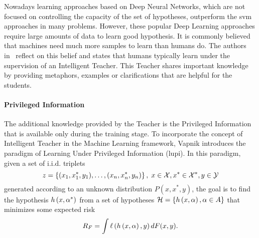 Nowadays learning approaches based on Deep Neural Networks, which are not focused on controlling the capacity of the set of hypotheses, outperform the \acrshort{svm} approaches in many problems. However, these popular Deep Learning approaches require large amounts of data to learn good hypothesis.
It is commonly believed that machines need much more samples to learn than humans do. The authors in~\citet{VapnikV09, VapnikI15a} reflect on this belief and states that humans typically learn under the supervision of an Intelligent Teacher.
This Teacher shares important knowledge by providing metaphors, examples or clarifications that are helpful for the students.



\paragraph*{Privileged Information\\}
The additional knowledge provided by the Teacher is the Privileged Information that is available only during the training stage.
To incorporate the concept of Intelligent Teacher in the Machine Learning framework, Vapnik introduces the paradigm of Learning Under Privileged Information (\acrshort{lupi}).
In this paradigm, given a set of i.i.d. triplets
$$ z = \left\{(x_1, x^*_1, y_1), \ldots, (x_n,x^*_n, y_n)\right\}, \; x \in \mathcal{X}, x^* \in \mathcal{X}^*, y \in \mathcal{Y} $$
generated according to an unknown distribution $P(x, x^*, y)$, the goal is to find the hypothesis $h\left(x, \alpha^*\right)$ from a set of hypotheses $\mathcal{H} = \left\{h\left(x, \alpha\right), \alpha \in A\right\}$ that minimizes some expected risk 
$$ R_F = \int \ell\left( h\left(x, \alpha\right), y\right) dF(x, y). $$

